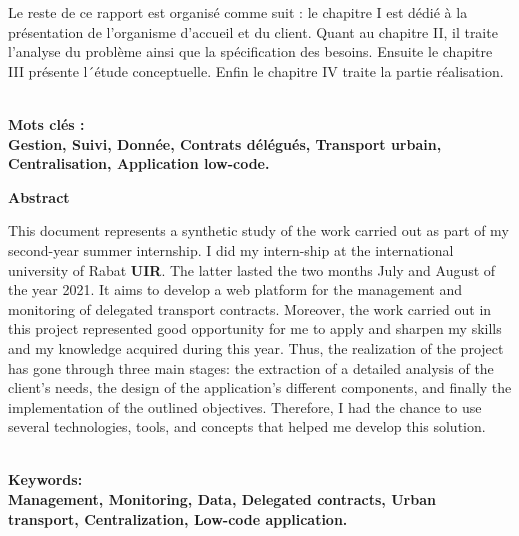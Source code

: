 \documentclass[a4paper]{report}
\begin{document}
\begin{doublespace}
	Le reste de ce rapport est organisé comme suit : le chapitre I est dédié à
	la présentation de
	l’organisme d’accueil et du client. Quant au chapitre II, il traite
	l’analyse du problème ainsi que la spécification des besoins. Ensuite le
	chapitre III présente l´étude conceptuelle. Enfin le chapitre IV traite la
	partie réalisation.

	\textbf	{\\Mots clés :\\ Gestion, Suivi, Donnée, Contrats délégués,
		Transport urbain, Centralisation, Application low-code.}

	\clearpage
	\begin{center}
		\vspace*{1cm}
		\textbf{\huge{Abstract}}
	\end{center}
	\renewcommand{\headrulewidth}{1pt}
	\fancyhead[L]{\hspace*{5cm}}

	This document represents a synthetic study of the work carried out as part
	of my second-year summer internship.
	I did my intern-ship at the international university of Rabat \textbf{UIR}.
	The latter lasted the two months
	July and August of the year 2021. It aims to develop a web platform for the
	management and monitoring of
	delegated transport contracts. Moreover, the work carried out in this
	project represented good opportunity
	for me to apply and sharpen my skills and my knowledge acquired during this
	year. Thus, the realization
	of the project has gone through three main stages: the extraction of a
	detailed analysis of the client's
	needs, the design of the application's different components, and finally
	the implementation of the outlined objectives.
	Therefore, I had the chance to use several technologies, tools, and
	concepts that helped me develop this solution.

	\textbf{\\Keywords:\\Management, Monitoring, Data, Delegated contracts,
		Urban transport, Centralization, Low-code application.}

\end{doublespace}

\newpage
\renewcommand{\headrulewidth}{1pt}
\fancyhead[L]{\hspace*{5cm}}
\tableofcontents

\cleardoublepage
\listoffigures
\end{document}
